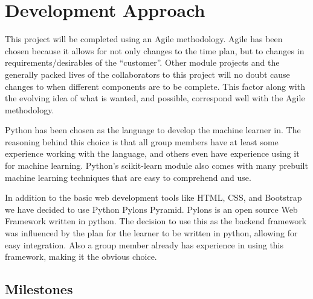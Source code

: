 \documentclass{ecmm427_assignment}
\begin{document}
\section{Development Approach}
 This project will be completed using an Agile methodology. Agile has been chosen because it allows for not only changes to the time plan, but to changes in requirements/desirables of the “customer”. Other module projects and the generally packed lives of the collaborators to this project will no doubt cause changes to when different components are to be complete. This factor along with the evolving idea of what is wanted, and possible, correspond well with the Agile methodology.

 Python has been chosen as the language to develop the machine learner in. The reasoning behind this choice is that all group members have at least some experience working with the language, and others even have experience using it for machine learning. Python’s scikit-learn module also comes with many prebuilt machine learning techniques that are easy to comprehend and use.

 In addition to the basic web development tools like HTML, CSS, and Bootstrap we have decided to use Python Pylons Pyramid. Pylons is an open source Web Framework written in python. The decision to use this as the backend framework was influenced by the plan for the learner to be written in python, allowing for easy integration. Also a group member already has experience in using this framework, making it the obvious choice.

\subsection{Milestones}
\end{document}
